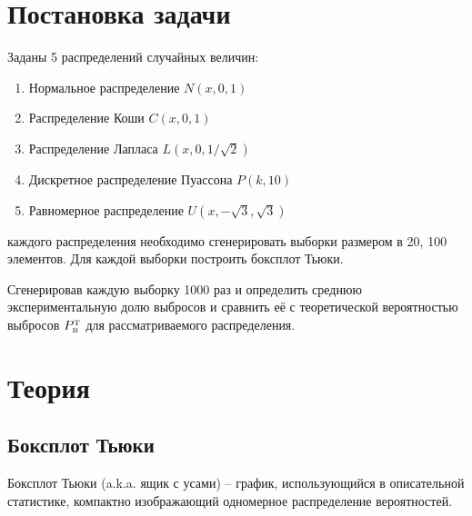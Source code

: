 \documentclass[12pt]{article}
\begin{document}
\begin{flushleft}

\setlength{\parindent}{1cm}

\tableofcontents

\newpage

\listoffigures

\newpage

\listoftables

\newpage

\section{Постановка задачи}
    
	Заданы 5 распределений случайных величин:

	\begin{enumerate}
		\item Нормальное распределение $N(x, 0, 1)$
		\item Распределение Коши $C(x, 0, 1)$
		\item Распределение Лапласа $L(x, 0, 1/\sqrt{2})$
		\item Дискретное распределение Пуассона $P(k, 10)$
		\item Равномерное распределение $U(x, -\sqrt{3}, \sqrt{3})$
	\end{enumerate}

     каждого распределения необходимо сгенерировать выборки размером в 20, 100 элементов. Для каждой выборки построить боксплот Тьюки.
    
    Сгенерировав каждую выборку 1000 раз и определить среднюю экспериментальную долю выбросов и сравнить её с теоретической вероятностью выбросов $P_{\text{\tiny{B}}}^{\text{\tiny{T}}}$ для рассматриваемого распределения. 

\newpage

\section{Теория}

    \subsection{Боксплот Тьюки}

        Боксплот Тьюки (a.k.a. ящик с усами) -- график, использующийся в описательной статистике, компактно изображающий одномерное распределение вероятностей.\cite{theory}


\end{flushleft}
\end{document}
